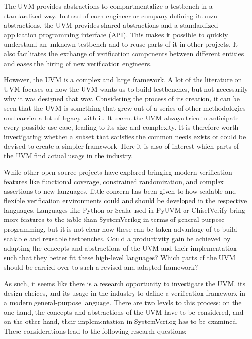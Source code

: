 The UVM provides abstractions to compartmentalize a testbench in a standardized way. Instead of each engineer or
company defining its own abstractions, the UVM provides shared abstractions and a standardized application
programming interface (API). This makes it possible to quickly
understand an unknown testbench and to reuse parts of it in other projects. It also facilitates the exchange of
verification components between different entities and eases the hiring of new verification engineers.

However, the UVM is a complex and large framework. A lot of the literature on UVM focuses on how the UVM wants us to
build testbenches, but not necessarily why it was designed that way. Considering the process of its creation, it can
be seen that the UVM is something that grew
out of a series of other methodologies and carries a lot of legacy with it. It seems the UVM always tries to anticipate
every possible use case, leading to its size and complexity. It is therefore worth investigating whether a subset that satisfies the common needs exists or could be devised to create a simpler framework. Here it is also of interest which parts of the UVM find actual usage in the industry.

While other open-source projects have explored bringing modern verification features like functional coverage,
constrained randomization, and complex assertions to new languages, little concern has been given to how scalable and
flexible verification environments could and should be developed in the respective languages. Languages like Python
or Scala used in PyUVM or ChiselVerify bring more features to the table than SystemVerilog in terms of
general-purpose programming, but it is not clear how these can be taken advantage of to build scalable and reusable
testbenches. Could a productivity gain be achieved by adapting the concepts and abstractions of the UVM and their
implementation such that they better fit these high-level languages? Which parts of the UVM should be carried over to
such a revised and adapted framework?

As such, it seems like there is a research opportunity to investigate the UVM, its design choices, and its usage in
the industry to define a verification framework in a modern general-purpose language. There are two levels
to this process: on the one hand, the concepts and abstractions of the UVM have to be considered, and on the other
hand, their implementation in SystemVerilog has to be examined. These considerations lead to the following research questions:

